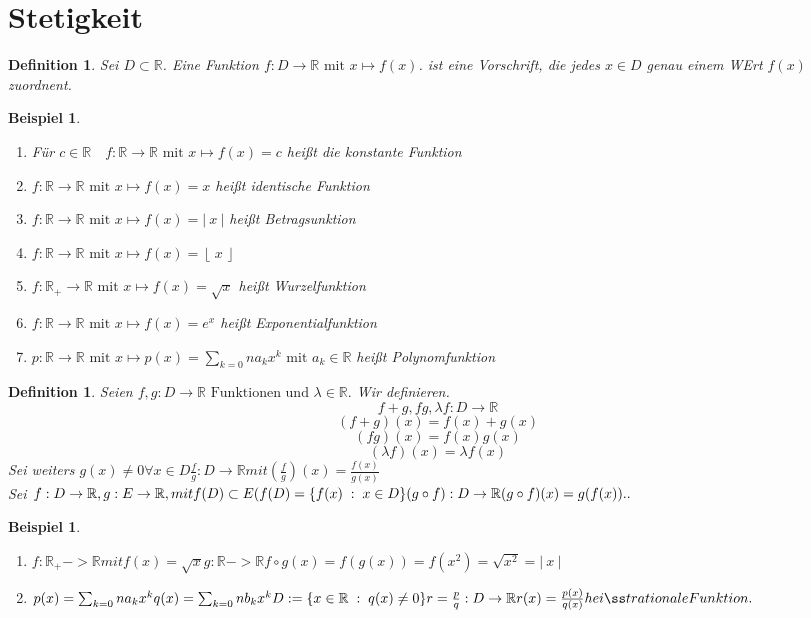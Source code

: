 \documentclass[a4paper,titlepage,oneside]{article}
\def\R{\ensuremath{\mathbb{R}} }
\def\sp{\hspace{0,1cm}}
\newcommand{\abs}[1]{\ensuremath{\left|\:#1\:\right|}}
\newcommand{\floor}[1]{\ensuremath{\left\lfloor\:#1\:\right\rfloor}}
\newcommand{\menge}[2]{\ensuremath{\{#1\sp : \sp #2\}}}
\theoremstyle{thmstyle}
\newtheorem{defi}[satz]{Definition}
\newtheorem{bsp}[satz]{Beispiel}
\begin{document}
\newpage
\section{Stetigkeit}
\begin{defi}
Sei $ D \subset \R$. Eine Funktion $f : D \to \R \text{ mit } x \mapsto f(x) $. ist eine Vorschrift, die jedes $ x \in D$ genau einem WErt $f(x)$ zuordnent.
\end{defi}

\begin{bsp}
\begin{enumerate}
\item Für $ c \in \R \quad f : \R \to \R \text{ mit } x \mapsto f(x) = c $ heißt die konstante Funktion %
\item $f : \R \to \R \text{ mit } x \mapsto f(x) = x $ heißt identische Funktion %
\item $f : \R \to \R \text{ mit } x \mapsto f(x) = \abs{x} $ heißt Betragsunktion %
\item $f : \R \to \R \text{ mit } x \mapsto f(x) = \floor{x} $ %
\item $f : \R_+ \to \R \text{ mit } x \mapsto f(x) = \sqrt{x} $ heißt Wurzelfunktion %
\item $f : \R \to \R \text{ mit } x \mapsto f(x) = e^x $ heißt Exponentialfunktion %
\item $p : \R \to \R \text{ mit } x \mapsto p(x) = \sum_{k=0}{n}{a_kx^k} \text{ mit } a_k \in \R $ heißt Polynomfunktion %
\end{enumerate}
\end{bsp}

\begin{defi}
Seien $f,g : D \to \R \text{ Funktionen und } \lambda \in \R.$ Wir definieren.
\[f+ g, f  g, \lambda f : D \to \R \]
\[(f+g)(x) = f(x) + g(x)\]
\[(fg)(x) = f(x) g(x)\]
\[(\lambda f)(x) = \lambda f(x) \]
Sei weiters $g(x) \ne 0 \forall x \in D
\frac{f}{g} : D \to \R mit \left(\frac{f}{g}\right)(x) = \frac{f(x)}{g(x)} $\\
Sei $ f: D \to \R, g: E \to \R, mit f(D) \subset E (f(D) = \menge{f(x)}{x \in D}
(g  \circ  f)  :  D \to \R
(g  \circ  f)(x) = g(f(x)) ..$
\end{defi}
 
\begin{bsp}
\begin{enumerate}
\item $f: \R_+ -> \R mit f(x) = \sqrt{x}
 g: \R -> \R
 f \circ g(x) = f(g(x)) = f(x^2) = \sqrt{x^2} = \abs{x}$
\item $
 p(x) = \sum_{k=0}{n}{a_kx^k}  
 q(x) = \sum_{k=0}{n}{b_kx^k}  
 D:= \menge{x\in \R}{q(x) \ne 0}
 r = \frac{p}{q} : D \to \R
 r(x) = \frac{p(x)}{q(x)} heißt rationale Funktion.$
\end{enumerate}
\end{bsp}
\end{document}
